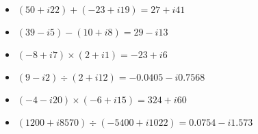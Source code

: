 \vskip 10pt

\begin{itemize}
\item{} $(50 + i22) + (-23 + i19) = 27 + i41$ 
\vskip 5pt
\item{} $(39 - i5) - (10 + i8) = 29 - i13$ 
\vskip 5pt
\item{} $(-8 + i7) \times (2 + i1) = -23 + i6$ 
\vskip 5pt
\item{} $(9 - i2) \div (2 + i12) = -0.0405 - i0.7568$ 
\vskip 5pt
\item{} $(-4 - i20) \times (-6 + i15) = 324 + i60$ 
\vskip 5pt
\item{} $(1200 + i8570) \div (-5400 + i1022) = 0.0754 - i1.573$ 
\end{itemize}











